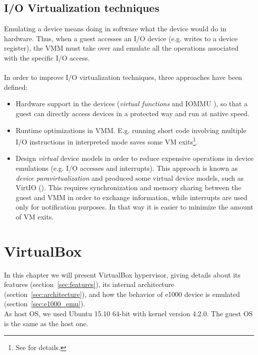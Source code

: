 \documentclass[a4paper, 12pt, titlepage]{report}
\begin{document}
\section{I/O Virtualization techniques}
Emulating a device means doing in software what the device would do in hardware. Thus, when a guest accesses an I/O device (e.g. writes to a device register), the VMM must take over and emulate all the operations associated with the specific I/O access.
\\
\\
In order to improve I/O virtualization techniques, three approaches have been defined:
\begin{itemize}
\item Hardware support in the devices (\textit{virtual functions} and IOMMU \cite{iommu}), so that a guest can directly access devices in a protected way and run at native speed.
\item Runtime optimizations in VMM. E.g. running short code involving multiple I/O instructions in interpreted mode saves some VM exits\footnote{See \cite{vmm_opt} for details.}.
\item Design \textit{virtual} device models in order to reduce expensive operations in device emulations (e.g. I/O accesses and interrupts). This approach is known as \textit{device paravirtualization} and produced some virtual device models, such as VirtIO (\cite{virtio}).
This requires synchronization and memory sharing between the guest and VMM in order to exchange information, while interrupts are used only for notification purposes. In that way it is easier to minimize the amount of VM exits.
\end{itemize}

\chapter{VirtualBox}
In this chapter we will present VirtualBox hypervisor, giving details about its features (section~\ref{sec:features}), its internal architecture (section~\ref{sec:architecture}), and how the behavior of e1000 device is emulated (section~\ref{sec:e1000_emu}).
\\
As host OS, we used Ubuntu 15.10 64-bit with kernel version 4.2.0. The guest OS is the same as the host one.
\end{document}
